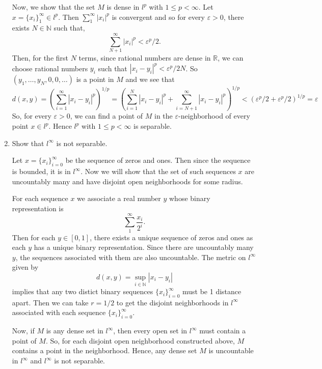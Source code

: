 \documentclass[12pt]{article}
\newcommand{\mR}{\mathbb{R}}
\begin{document}
\begin{enumerate}
\begin{mybox}
    \vspace*{3mm}
    Now, we show that the set $M$ is dense in $l^p$
    with $1 \leq p <\infty$. Let $x=\{x_i\}_1^\infty
    \in l^p$. Then $\sum_1^\infty{|x_i|^p}$ is
    convergent and so for every
    $\varepsilon>0$, there exists $N\in\mathbb{N}$ such
    that,
    $$\sum_{N+1}^\infty{|x_i|^p}<\varepsilon^p/2.$$
    Then, for the first $N$ terms, since rational numbers
    are dense in $\mR$, we can choose rational numbers
    $y_i$ such that $|x_i-y_i|^p<\varepsilon^p/2N$.
    So $(y_1,\ldots,y_N,0,0,\ldots)$ is a point in $M$ and
    we see that
    $$d(x,y)=\left(\sum_{i=1}^\infty{|x_i-y_i|^p}\right)
    ^{1/p}=\left(\sum_{i=1}^N{|x_i-y_i|^p}
    +\sum_{i=N+1}^\infty{|x_i-y_i|^p}\right)
    ^{1/p}<(\varepsilon^p/2+\varepsilon^p/2)^{1/p}
    =\varepsilon$$
    So, for every $\varepsilon>0$, we can find a point
    of $M$ in the $\varepsilon$-neighborhood of every
    point $x\in l^p$. Hence $l^p$ with
    $1 \leq p <\infty$ is separable.
\end{mybox}
 
\item Show that $l^{\infty}$ is not separable.
\begin{mybox}

    Let $x=\{x_i\}_{i=0}^\infty$ be the sequence
    of zeros and ones. Then since the sequence
    is bounded, it is in $l^\infty$. Now we
    will show that the set of such sequences $x$
    are uncountably many and have disjoint
    open neighborhoods for some radius.

    \vspace*{3mm}
    For each sequence $x$ we associate a real
    number $y$ whose binary
    representation is
    $$\sum_1^{\infty}{\frac{x_i}{2^i}}.$$
    Then for each $y\in [0,1]$, there exists
    a unique sequence of zeros and ones as each
    $y$ has a unique binary representation. Since
    there are uncountably many $y$, the sequences
    associated with them are also uncountable.
    The metric on $l^\infty$ given by
    $$d(x,y)=\sup_{i\in \mathbb{N}}{|x_i-y_i|}$$
    implies that any two distict binary sequences
    $\{x_i\}_{i=0}^\infty$ must be 1 distance
    apart. Then we can take $r=1/2$ to get the
    disjoint neighborhoods in $l^\infty$
    associated with each sequence
    $\{x_i\}_{i=0}^\infty$.

    \vspace*{3mm}
    Now, if $M$ is any dense set in $l^\infty$,
    then every open set in $l^\infty$ must contain
    a point of $M$. So, for each disjoint
    open neighborhood constructed above, $M$
    contains a point in the neighborhood. Hence,
    any dense set $M$ is uncountable in $l^\infty$
    and $l^\infty$ is not separable.
\end{mybox}
 

\end{enumerate}
\end{document}

